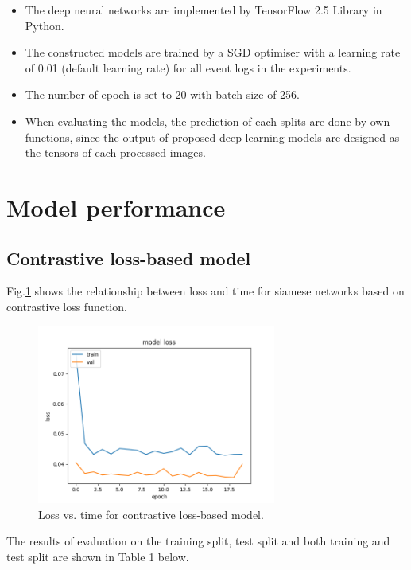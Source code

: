 \documentclass{article}
\begin{document}
\begin{itemize}
  \item The deep neural networks are implemented by TensorFlow 2.5 Library in Python.
  \item The constructed models are trained by a SGD optimiser with a learning rate of 0.01 (default learning rate) for all event logs in the experiments.
  \item The number of epoch is set to 20 with batch size of 256.
  \item When evaluating the models, the prediction of each splits are done by own functions, since the output of proposed deep learning models are designed as the tensors of each processed images. 
\end{itemize}

\section{Model performance}

\subsection{Contrastive loss-based model}

Fig.\ref{Siamese-network-with-contrastive-loss} shows the relationship between loss and time for siamese networks based on contrastive loss function.

\begin{figure}[!ht]
  \centering
  \includegraphics[width=0.7\textwidth]{image/Siamese-network-with-contrastive-loss.png}
  \caption{Loss vs. time for contrastive loss-based model.}\label{Siamese-network-with-contrastive-loss}
\end{figure}

The results of evaluation on the training split, test split and both training and test split are shown in Table 1 below.
\end{document}
